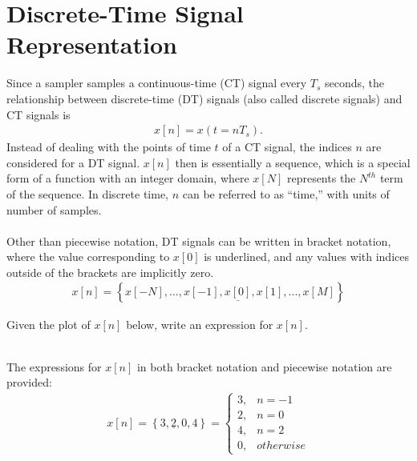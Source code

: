 \documentclass{report}
\begin{document}
\section{Discrete-Time Signal Representation}
Since a sampler samples a continuous-time (CT) signal every $T_s$ seconds, the relationship between discrete-time (DT) signals (also called discrete signals) and CT signals is 
\begin{align}
    x[n] = x(t=nT_s).
\end{align}
Instead of dealing with the points of time $t$ of a CT signal, the indices $n$ are considered for a DT signal. $x[n]$ then is essentially a sequence, which is a special form of a function 
with an integer domain, where $x[N]$ represents the $N^{th}$ term of the sequence. In discrete time, $n$ can be referred to as ``time,'' with units of number of samples.
\\ \\
Other than piecewise notation, DT signals can be written in bracket notation, where the value corresponding to $x[0]$ is underlined, and any values with indices outside of the brackets are implicitly zero. 
\begin{align}
    x[n] = \left\{x[-N], ..., x[-1],\underline{x[0]}, x[1], ..., x[M]\right\}
\end{align}

\begin{example}
    Given the plot of $x[n]$ below, write an expression for $x[n]$. \\ \\
\end{example}
\begin{solution}
    The expressions for $x[n]$ in both bracket notation and piecewise notation are provided:
    \begin{align*}
        x[n] = \left\{3,\underline{2},0,4\right\} = 
        \begin{cases}
            3, & n=-1 \\
            2, & n=0 \\
            4, & n=2 \\
            0, & otherwise
        \end{cases}
    \end{align*}
\end{solution}
\end{document}
